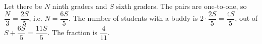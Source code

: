 Let there be $N$ ninth graders and $S$ sixth graders. The pairs are one-to-one, so $\dfrac N3=\dfrac{2S}5$, i.e. $N=\dfrac{6S}5$. The number of students with a buddy is $2\cdot\dfrac{2S}{5}=\dfrac{4S}5$, out of $S+\dfrac{6S}5=\dfrac{11S}5$. The fraction is $\boxed{\dfrac4{11}}$.
